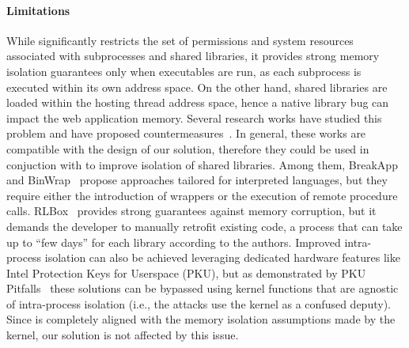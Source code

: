   \paragraph{Limitations}
  While \natisand significantly restricts the set of permissions and system
  resources associated with subprocesses and shared libraries, it
  provides strong memory isolation guarantees only when executables
  are run, as each subprocess is executed within its own address
  space. On the other hand, shared libraries are loaded within the
  hosting thread address space, hence a native library bug can impact
  the web application memory. Several research works have studied this
  problem and have proposed countermeasures~\cite{RLBox,
    kirth2022pkru, wu2012codejail, cali, vasilakis2018breakapp,
    binwrap}. In general, these works are compatible with the design
  of our solution, therefore they could be used in conjuction with
  \natisand to improve isolation of shared libraries. Among them,
  BreakApp~\cite{vasilakis2018breakapp} and BinWrap~\cite{binwrap}
  propose approaches tailored for interpreted languages, but they
  require either the introduction of wrappers or the execution of
  remote procedure calls. RLBox~\cite{RLBox} provides strong
  guarantees against memory corruption, but it demands the developer
  to manually retrofit existing code, a process that can take up to
  ``few days'' for each library according to the authors. Improved
  intra-process isolation can also be achieved leveraging dedicated
  hardware features like Intel Protection Keys for Userspace (PKU),
  but as demonstrated by PKU Pitfalls~\cite{pku-pitfalls} these
  solutions can be bypassed using kernel functions that are agnostic
  of intra-process isolation (i.e., the attacks use the kernel as a
  confused deputy). Since \natisand is completely aligned with the memory
  isolation assumptions made by the kernel, our solution is not
  affected by this issue.  




